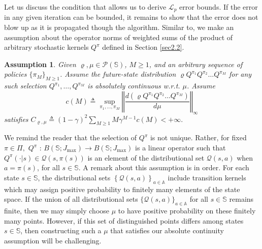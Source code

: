 \documentclass[12pt,technote,onecolumn]{IEEEtran}
\newtheorem{assumption}{Assumption}
\begin{document}

Let us discuss the condition that allows us to derive $\mathcal{L}_{p}$
error bounds. If the error in any given iteration can be bounded,
it remains to show that the error does not blow up as it is propagated
though the algorithm. Similar to\cite[Assumption A2]{munos2008finite},
we make an assumption about the operator norms of weighted sums of
the product of arbitrary stochastic kernels $Q^{\pi}$ defined in
Section \ref{sec2.2}.
\begin{assumption}
	\label{assu:Absolute_continuity} Given $\varrho,\mu\in\mathcal{P}\left(\mathbb{S}\right)$,
	$M\geq1$, and an arbitrary sequence of policies $\{ \pi_{M}\} _{M\geq1}$. Assume the future-state distribution $\varrho Q^{\pi_{1}}Q^{\pi_{2}}\dots Q^{\pi_{M}}$
	for any such selection $Q^{\pi_{1}},\ldots,Q^{\pi_{M}}$ is absolutely
	continuous w.r.t. $\mu$. Assume	
	\[
	c\left(M\right)\triangleq\sup_{\pi_{1},\dots,\pi_{M}}\left\Vert \frac{d\left(\varrho Q^{\pi_{1}}Q^{\pi_{2}}\dots Q^{\pi_{M}}\right)}{d\mu}\right\Vert _{\infty}
	\]
	satisfies	
	$
	C_{\varrho,\mu}\triangleq\left(1-\gamma\right)^{2}\sum_{M\geq1}M\gamma^{M-1}c\left(M\right)<+\infty.
	$
\end{assumption}

We remind the reader that the selection of $Q^{\pi}$ is not unique.
Rather, for fixed $\pi\in\Pi,$ $Q^{\pi}\mbox{ : } B\left(\mathbb{S};J_{\max}\right)\rightarrow  B\left(\mathbb{S};J_{\max}\right)$
is a linear operator such that $Q^{\pi}\left(\cdot\vert s\right)\in\mathcal{Q}\left(s,\pi\left(s\right)\right)$
is an element of the distributional set $\mathcal{Q}\left(s,a\right)$
when $a=\pi\left(s\right)$, for all $s\in\mathbb{S}$. A remark about
this assumption is in order. For each state $s\in\mathbb{S}$, the
distributional sets $\left\{ \mathcal{Q}\left(s,a\right)\right\} _{a\in\mathbb{A}}$
include transition kernels which may assign positive probability to
finitely many elements of the state space. If the union of all distributional
sets $\{ \mathcal{Q}(s,a)\} _{a\in\mathbb{A}}$
for all $s\in\mathbb{S}$ remains finite, then we may simply choose
$\mu$ to have positive probability on these finitely many points.
However, if this set of distinguished points differs among states
$s\in\mathbb{S}$, then constructing such a $\mu$ that satisfies
our absolute continuity assumption will be challenging.
\end{document}
